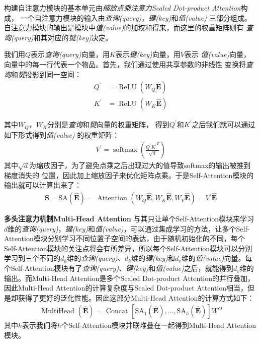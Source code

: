 构建自注意力模块的基本单元由\textit{缩放点乘注意力Scaled Dot-product Attention}构成，%
一个自注意力模块的输入由\textit{查询(query)}，\textit{键(key)}和\textit{值(value)}%
三部分组成。自注意力模块的输出是模块中\textit{值(value)}的加权和得来，而这里的权重矩阵则有%
\textit{查询(query)}和其对应的\textit{键(key)}决定。

我们用$Q$表示\textit{查询(query)}向量，用$K$表示\textit{键(key)}向量，用$V$表示%
\textit{值(value)}向量，向量中的每一行代表一个物品。首先，我们通过使用共享参数的非线性%
变换将\textit{查询}和\textit{键}投影到同一空间：
\begin{align} 
	Q^{\prime} &=\operatorname{ReLU}(W_{Q}\widehat{\mathbf{E}}) \\ 
	K^{\prime} &=\operatorname{ReLU}(W_{K}\widehat{\mathbf{E}})
\end{align}

其中$W_{Q}$，$W_{K}$分别是\textit{查询}和\textit{键}向量的权重矩阵，%
得到$Q^{\prime}$和$K^{\prime}$之后我们就可以通过如下形式得到\textit{值(value)}%
的权重矩阵：
\begin{align} 
	V^{\prime}=\operatorname{softmax}(\frac{Q^{\prime} {K^{\prime}}^{T}}{\sqrt{d}})
\end{align}
其中$\sqrt{d}$为缩放因子，为了避免点乘之后出现过大的值导致softmax的输出被推到梯度消失的%
位置，因此加上缩放因子来优化矩阵点乘。于是Self-Attention模块的输出就可以计算出来了：
\begin{align} 
	\mathbf{S}=\mathrm{SA}(\widehat{\mathbf{E}})=\text { Attention }(W_{Q}\widehat{\mathbf{E}}, W_{K}\widehat{\mathbf{E}}, W_{V}\widehat{\mathbf{E}}) = V^{\prime}\widehat{\mathbf{E}}
\end{align}

\textbf{多头注意力机制Multi-Head Attention}
与其只让单个Self-Attention模块来学习$d$维的\textit{查询(query)}，\textit{键(key)}和\textit{值(value)}，可以通过集成学习的方法，让多个Self-Attention模块分别学习不同位置子空间的表达，由于随机初始化的不同，每个Self-Attention模块的关注点将会有所差异，所以每个Self-Attention模块可以分别学习到三个不同的$d_{k}$维的\textit{查询(query)}、$d_{k}$维的\textit{键(key)}和$d_{v}$维的\textit{值(value)}向量。每个Self-Attention模块有了\textit{查询(query)}、\textit{键(key)}和\textit{值(value)}之后，就能得到$d_{v}$维的输出。而Multi-Head Attention是多个Scaled Dot-product Attention的并行叠加，因此Multi-Head Attention的计算复杂度与Scaled Dot-product Attention相当，但是却获得了更好的泛化性能。因此这部分Multi-Head Attention的计算方式如下：
\begin{align} 
	\text { MultiHead }(\widehat{\mathbf{E}}) =\text { Concat }[\mathrm{SA}_{1}(\widehat{\mathbf{E}}), \ldots, \mathrm{SA}_{h}(\widehat{\mathbf{E}})] W^{O}
\end{align}
其中$h$表示我们将$h$个Self-Attention模块并联堆叠在一起得到Multi-Head Attention模块。

